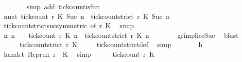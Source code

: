 \begin{isabellebody}
\ \ \ \ \ \ \isamarkupfalse%
\ {\isacharparenleft}simp\ add{\isacharcolon}\ tick{\isacharunderscore}count{\isacharunderscore}is{\isacharunderscore}fun{\isacharparenright}\ \isanewline
\ \ \ \ \isamarkupfalse%
\ {\isacartoucheopen}{\isasymforall}n{\isacharcolon}{\isacharcolon}nat{\isachardot}\ {\isacharparenleft}tick{\isacharunderscore}count\ r\ K\ {\isacharparenleft}Suc\ n{\isacharparenright}{\isacharparenright}\ {\isasymle}\ {\isacharparenleft}tick{\isacharunderscore}count{\isacharunderscore}strict\ r\ K\ {\isacharparenleft}Suc\ n{\isacharparenright}{\isacharparenright}{\isacartoucheclose}\isanewline
\ \ \ \ \ \ \isamarkupfalse%
\ tick{\isacharunderscore}count{\isacharunderscore}strict{\isacharunderscore}suc{\isacharbrackleft}symmetric{\isacharcomma}\ of\ {\isacartoucheopen}r{\isacartoucheclose}\ {\isacartoucheopen}K\ \isamarkupfalse%
\ simp\isanewline
\ \ \ \ \isamarkupfalse%
\ {\isacharasterisk}{\isacharcolon}{\isacartoucheopen}{\isasymforall}n{\isachardot}\ n\ {\isachargreater}\ {}\ {\isasymlongrightarrow}\ {\isacharparenleft}tick{\isacharunderscore}count\ r\ K\ n{\isacharparenright}\ {\isasymle}\ {\isacharparenleft}tick{\isacharunderscore}count{\isacharunderscore}strict\ r\ K\ n{\isacharparenright}{\isacartoucheclose}\isanewline
\ \ \ \ \ \ \isamarkupfalse%
\ gr{}{\isacharunderscore}implies{\isacharunderscore}Suc\ \isamarkupfalse%
\ blast\isanewline
\ \ \ \ \isamarkupfalse%
\ {\isacartoucheopen}tick{\isacharunderscore}count{\isacharunderscore}strict\ r\ K\ {}\ {\isacharequal}\ {}{\isacartoucheclose}\ \isamarkupfalse%
\ tick{\isacharunderscore}count{\isacharunderscore}strict{\isacharunderscore}def\ \isamarkupfalse%
\ simp\isanewline
\ \ \ \ \isamarkupfalse%
\ \isamarkupfalse%
\ h\ \isamarkupfalse%
\ {\isacartoucheopen}{\isasymnot}hamlet\ {\isacharparenleft}{\isacharparenleft}Rep{\isacharunderscore}run\ r{\isacharparenright}\ {}\ K\ \isamarkupfalse%
\ simp\isanewline
\ \ \ \ \isamarkupfalse%
\ {\isacartoucheopen}tick{\isacharunderscore}count\ r\ K\ {}\ {\isacharequal}\ {}{\isacartoucheclose}\ \isamarkupfalse%

\end{isabellebody}
